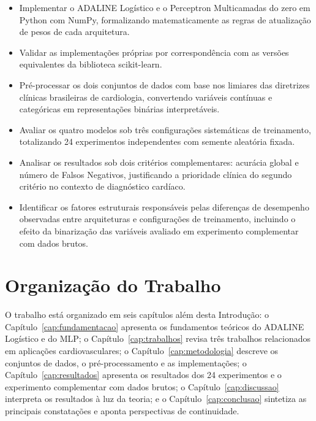 \begin{itemize}
  \item Implementar o ADALINE Log\'istico e o Perceptron Multicamadas do zero em Python com NumPy, formalizando matematicamente as regras de atualiza\c c\~ao de pesos de cada arquitetura.
  \item Validar as implementa\c c\~oes pr\'oprias por correspond\^encia com as vers\~oes equivalentes da biblioteca scikit-learn.
  \item Pr\'e-processar os dois conjuntos de dados com base nos limiares das diretrizes cl\'inicas brasileiras de cardiologia, convertendo vari\'aveis cont\'inuas e categ\'oricas em representa\c c\~oes bin\'arias interpret\'aveis.
  \item Avaliar os quatro modelos sob tr\^es configura\c c\~oes sistem\'aticas de treinamento, totalizando 24 experimentos independentes com semente aleat\'oria fixada.
  \item Analisar os resultados sob dois crit\'erios complementares: acur\'acia global e n\'umero de Falsos Negativos, justificando a prioridade cl\'inica do segundo crit\'erio no contexto de diagn\'ostico card\'iaco.
  \item Identificar os fatores estruturais respons\'aveis pelas diferen\c cas de desempenho observadas entre arquiteturas e configura\c c\~oes de treinamento, incluindo o efeito da binariza\c c\~ao das vari\'aveis avaliado em experimento complementar com dados brutos.
\end{itemize}

\section{Organiza\c c\~ao do Trabalho}

O trabalho est\'a organizado em seis cap\'itulos al\'em desta Introdu\c c\~ao: o Cap\'itulo~\ref{cap:fundamentacao} apresenta os fundamentos te\'oricos do ADALINE Log\'istico e do MLP; o Cap\'itulo~\ref{cap:trabalhos} revisa tr\^es trabalhos relacionados em aplica\c c\~oes cardiovasculares; o Cap\'itulo~\ref{cap:metodologia} descreve os conjuntos de dados, o pr\'e-processamento e as implementa\c c\~oes; o Cap\'itulo~\ref{cap:resultados} apresenta os resultados dos 24 experimentos e o experimento complementar com dados brutos; o Cap\'itulo~\ref{cap:discussao} interpreta os resultados \`a luz da teoria; e o Cap\'itulo~\ref{cap:conclusao} sintetiza as principais constata\c c\~oes e aponta perspectivas de continuidade.
